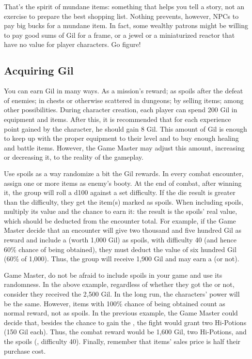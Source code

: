 \begin{multicols}{2}
That's the spirit of mundane items: something that helps you tell a story, not an exercise to prepare the best shopping list. Nothing prevents, however, NPCs to pay big bucks for a mundane item. In fact, some wealthy patrons might be willing to pay good sums of Gil for a frame, or a jewel or a miniaturized reactor that have no value for player characters. Go figure!

\subsection{Acquiring Gil}\label{subsec:inv-acquire}
You can earn Gil in many ways. As a mission’s reward; as spoils after the defeat of enemies; in chests or otherwise scattered in dungeons; by selling items; among other possibilities. During character creation, each player can spend 200 Gil in equipment and items. After this, it is recommended that for each experience point gained by the character, he should gain 8 Gil. This amount of Gil is enough to keep up with the proper equipment to their level and to buy enough healing and battle items. However, the Game Master may adjust this amount, increasing or decreasing it, to the reality of the gameplay.

Use spoils as a way randomize a bit the Gil rewards. In every combat encounter, assign one or more items as enemy’s booty. At the end of combat, after winning it, the group will roll a d100 against a set difficulty. If the die result is greater than the difficulty, they get the item(s) marked as spoils. When including spoils, multiply its value and the chance to earn it: the result is the spoils’ real value, which should be deducted from the encounter total. For example, if the Game Master decide that an encounter will give two thousand and five hundred Gil as reward and include a  (worth 1,000 Gil) as spoils, with difficulty 40 (and hence 60\% chance of being obtained), they must deduct the value of six hundred Gil (60\% of 1,000). Thus, the group will receive 1,900 Gil and may earn a  (or not). %

Game Master, do not be afraid to include spoils in your game and use its randomness. In the above example, regardless of whether they got the  or not, consider they received the 2,500 Gil. In the long run, the characters’ power will be the same. However, items with 100\% chance of being obtained count as normal reward, not as spoils. In the previous example, the Game Master could decide that, besides the chance to gain the , the fight would grant two Hi-Potions (150 Gil each). Thus, the combat reward would be 1,600 Gil, two Hi-Potions, and the spoils (, difficulty 40). Finally, remember that items’ sales price is half their purchase cost.


\end{multicols}
